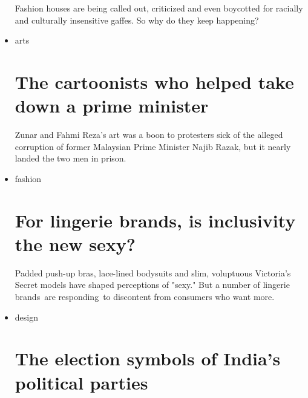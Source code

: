 \begin{itemize}
  \href{/style/article/fashion-gaffes-industry-diversity-problem/index.html}{}

  Fashion houses are being called out, criticized and even boycotted for
  racially and culturally insensitive gaffes. So why do they keep
  happening?
\item
  \href{/style/arts}{}

  arts

  \href{/style/article/malaysia-1mdb-najib-zunar-fahmi-reza-intl/index.html}{}

  \hypertarget{the-cartoonists-who-helped-take-down-a-prime-minister}{%
  \section{The cartoonists who helped take down a prime
  minister}\label{the-cartoonists-who-helped-take-down-a-prime-minister}}

  \href{/style/article/malaysia-1mdb-najib-zunar-fahmi-reza-intl/index.html}{}

  Zunar and Fahmi Reza's art was a boon to protesters sick of the
  alleged corruption of former Malaysian Prime Minister Najib Razak, but
  it nearly landed the two men in prison.
\item
  \href{/style/fashion}{}

  fashion

  \href{/style/article/lingerie-designers-inclusivity/index.html}{}

  \hypertarget{for-lingerie-brands-is-inclusivity-the-new-sexy}{%
  \section{For lingerie brands, is inclusivity the new
  sexy?}\label{for-lingerie-brands-is-inclusivity-the-new-sexy}}

  \href{/style/article/lingerie-designers-inclusivity/index.html}{}

  Padded push-up bras, lace-lined bodysuits and slim, voluptuous
  Victoria's Secret models have shaped perceptions of "sexy." But a
  number of lingerie brands~are responding~to discontent from consumers
  who want more.
\item
  \href{/style/design}{}

  design

  \href{/style/article/india-election-party-symbols/index.html}{}

  \hypertarget{the-election-symbols-of-indias-political-parties}{%
  \section{The election symbols of India's political
  parties}\label{the-election-symbols-of-indias-political-parties}}


\end{itemize}
